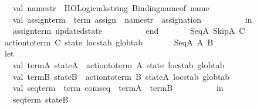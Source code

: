 \begin{isabellebody}
\ \ \ \ \ \ \ \ \ \ \ \ val\ name{\isacharunderscore}{\kern0pt}str\ {\isacharequal}{\kern0pt}\ HOLogic{\isachardot}{\kern0pt}mk{\isacharunderscore}{\kern0pt}string\ {\isacharparenleft}{\kern0pt}Binding{\isachardot}{\kern0pt}name{\isacharunderscore}{\kern0pt}of\ name{\isacharparenright}{\kern0pt}\isanewline
\ \ \ \ \ \ \ \ \ \ \ \ val\ assign{\isacharunderscore}{\kern0pt}term\ {\isacharequal}{\kern0pt}\ {\isacharat}{\kern0pt}{\isacharbraceleft}{\kern0pt}term\ assign{\isacharbraceright}{\kern0pt}\ {\isachardollar}{\kern0pt}\ name{\isacharunderscore}{\kern0pt}str\ {\isachardollar}{\kern0pt}\ assignation\isanewline
\ \ \ \ \ \ \ \ \ \ in\isanewline
\ \ \ \ \ \ \ \ \ \ \ \ {\isacharparenleft}{\kern0pt}assign{\isacharunderscore}{\kern0pt}term{\isacharcomma}{\kern0pt}\ updated{\isacharunderscore}{\kern0pt}state{\isacharparenright}{\kern0pt}\isanewline
\ \ \ \ \ \ \ \ \ \ end\isanewline
\isanewline
\ \ \ \ \ \ {\isacharbar}{\kern0pt}\ SeqA\ {\isacharparenleft}{\kern0pt}SkipA{\isacharcomma}{\kern0pt}\ C{\isacharparenright}{\kern0pt}\ {\isacharequal}{\kern0pt}{\isachargreater}{\kern0pt}\isanewline
\ \ \ \ \ \ \ \ \ \ action{\isacharunderscore}{\kern0pt}to{\isacharunderscore}{\kern0pt}term\ C\ state\ locstab\ globtab\isanewline
\isanewline
\ \ \ \ \ \ {\isacharbar}{\kern0pt}\ SeqA\ {\isacharparenleft}{\kern0pt}A{\isacharcomma}{\kern0pt}\ B{\isacharparenright}{\kern0pt}\ {\isacharequal}{\kern0pt}{\isachargreater}{\kern0pt}\isanewline
\ \ \ \ \ \ \ \ \ \ let\isanewline
\ \ \ \ \ \ \ \ \ \ \ \ val\ {\isacharparenleft}{\kern0pt}term{\isacharunderscore}{\kern0pt}A{\isacharcomma}{\kern0pt}\ stateA{\isacharparenright}{\kern0pt}\ {\isacharequal}{\kern0pt}\ action{\isacharunderscore}{\kern0pt}to{\isacharunderscore}{\kern0pt}term\ A\ state\ locstab\ globtab\isanewline
\ \ \ \ \ \ \ \ \ \ \ \ val\ {\isacharparenleft}{\kern0pt}term{\isacharunderscore}{\kern0pt}B{\isacharcomma}{\kern0pt}\ stateB{\isacharparenright}{\kern0pt}\ {\isacharequal}{\kern0pt}\ action{\isacharunderscore}{\kern0pt}to{\isacharunderscore}{\kern0pt}term\ B\ stateA\ locstab\ globtab\isanewline
\ \ \ \ \ \ \ \ \ \ \ \ val\ seq{\isacharunderscore}{\kern0pt}term\ {\isacharequal}{\kern0pt}\ {\isacharat}{\kern0pt}{\isacharbraceleft}{\kern0pt}term\ com{\isachardot}{\kern0pt}seq{\isacharbraceright}{\kern0pt}\ {\isachardollar}{\kern0pt}\ term{\isacharunderscore}{\kern0pt}A\ {\isachardollar}{\kern0pt}\ term{\isacharunderscore}{\kern0pt}B\isanewline
\ \ \ \ \ \ \ \ \ \ in\isanewline
\ \ \ \ \ \ \ \ \ \ \ \ {\isacharparenleft}{\kern0pt}seq{\isacharunderscore}{\kern0pt}term{\isacharcomma}{\kern0pt}\ stateB{\isacharparenright}{\kern0pt}\isanewline

\end{isabellebody}
